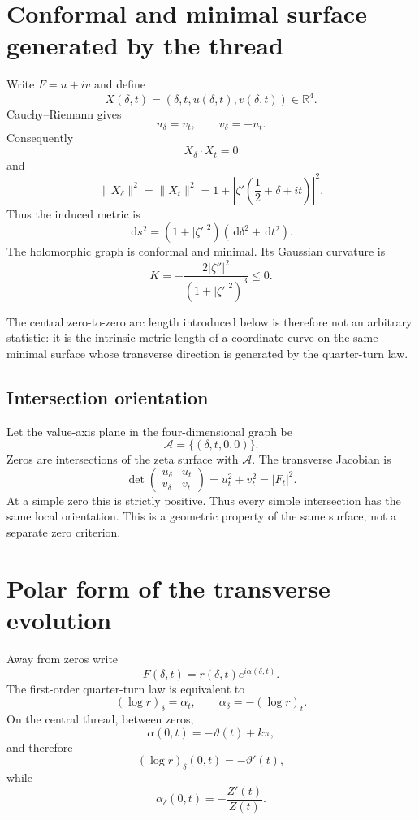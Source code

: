 \documentclass[11pt]{article}
\theoremstyle{definition}
\newcommand{\dd}{\,\mathrm d}
\newcommand{\R}{\mathbb R}
\begin{document}
\section{Conformal and minimal surface generated by the thread}

Write $F=u+iv$ and define
\[
X(\delta,t)=(\delta,t,u(\delta,t),v(\delta,t))\in\R^4.
\]
Cauchy--Riemann gives
\[
u_\delta=v_t,\qquad v_\delta=-u_t.
\]
Consequently
\[
\boxed{X_\delta\cdot X_t=0}
\]
and
\[
\boxed{
\|X_\delta\|^2=\|X_t\|^2
=
1+\left|\zeta'\!\left(\frac12+\delta+it\right)\right|^2.
}
\]
Thus the induced metric is
\[
\boxed{
\dd s^2
=
\left(1+|\zeta'|^2\right)
(\dd\delta^2+\dd t^2).
}
\]
The holomorphic graph is conformal and minimal.  Its Gaussian curvature is
\[
\boxed{
K
=
-\frac{2|\zeta''|^2}{(1+|\zeta'|^2)^3}
\le0.
}
\]

The central zero-to-zero arc length introduced below is therefore not an
arbitrary statistic: it is the intrinsic metric length of a coordinate curve
on the same minimal surface whose transverse direction is generated by the
quarter-turn law.

\subsection{Intersection orientation}

Let the value-axis plane in the four-dimensional graph be
\[
\mathcal A=\{(\delta,t,0,0)\}.
\]
Zeros are intersections of the zeta surface with $\mathcal A$.  The
transverse Jacobian is
\[
\det
\begin{pmatrix}
u_\delta&u_t\\
v_\delta&v_t
\end{pmatrix}
=
u_t^2+v_t^2
=
|F_t|^2.
\]
At a simple zero this is strictly positive.  Thus every simple intersection
has the same local orientation.  This is a geometric property of the same
surface, not a separate zero criterion.

\section{Polar form of the transverse evolution}

Away from zeros write
\[
F(\delta,t)=r(\delta,t)e^{i\alpha(\delta,t)}.
\]
The first-order quarter-turn law is equivalent to
\[
\boxed{
(\log r)_\delta=\alpha_t,
\qquad
\alpha_\delta=-(\log r)_t.
}
\]
On the central thread, between zeros,
\[
\alpha(0,t)=-\vartheta(t)+k\pi,
\]
and therefore
\[
\boxed{
(\log r)_\delta(0,t)=-\vartheta'(t),
}
\]
while
\[
\boxed{
\alpha_\delta(0,t)=-\frac{Z'(t)}{Z(t)}.
}
\]
\end{document}
